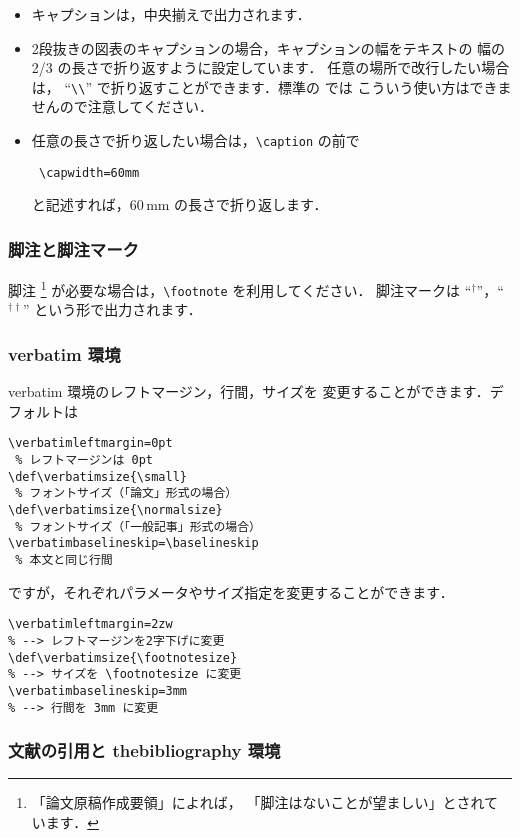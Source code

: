 \documentclass[paper]{jrsj}    %
\def\verbatimsize{\small}%
\begin{document}
\begin{itemize}
 \item
 キャプションは，中央揃えで出力されます．
 \item
 2段抜きの図表のキャプションの場合，キャプションの幅をテキストの
 幅の 2/3 の長さで折り返すように設定しています．
 任意の場所で改行したい場合は，
 ``\verb/\\/'' で折り返すことができます．標準の \LaTeXe{} では
 こういう使い方はできませんので注意してください．
 \item
 任意の長さで折り返したい場合は，\verb/\caption/ の前で
\begin{verbatim}
 \capwidth=60mm
\end{verbatim}
 と記述すれば，60\,mm の長さで折り返します．
\end{itemize}

\subsubsection{脚注と脚注マーク}\label{sec:footnote}

脚注%
\footnote{「論文原稿作成要領」によれば，
「脚注はないことが望ましい」とされています．}%
が必要な場合は，\verb/\footnote/ を利用してください．
脚注マークは ``$^\dagger$''，``$^{\dagger\dagger}$'' という形で出力されます．

\subsubsection{verbatim 環境}

verbatim 環境のレフトマージン，行間，サイズを
変更することができます\cite{bibunsho2}．デフォルトは
\begin{verbatim}
\verbatimleftmargin=0pt
 % レフトマージンは 0pt 
\def\verbatimsize{\small}
 % フォントサイズ（「論文」形式の場合）
\def\verbatimsize{\normalsize}
 % フォントサイズ（「一般記事」形式の場合）
\verbatimbaselineskip=\baselineskip
 % 本文と同じ行間
\end{verbatim}
ですが，それぞれパラメータやサイズ指定を変更することができます．
\begin{verbatim}
\verbatimleftmargin=2zw
% --> レフトマージンを2字下げに変更
\def\verbatimsize{\footnotesize}
% --> サイズを \footnotesize に変更
\verbatimbaselineskip=3mm
% --> 行間を 3mm に変更
\end{verbatim}

\subsubsection{文献の引用と thebibliography 環境}
\end{document}
